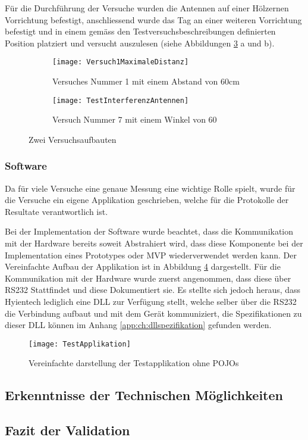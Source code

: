 Für die Durchführung der Versuche wurden die Antennen auf einer Hölzernen Vorrichtung befestigt, anschliessend wurde das Tag an einer weiteren Vorrichtung befestigt und in einem gemäss den Testversuchsbeschreibungen definierten Position platziert und versucht auszulesen (siehe Abbildungen \ref{fig:versuchsaufbauten} a und b).
\begin{figure}[h!]
	\begin{subfigure}{.5\linewidth}
		\texttt{[image: Versuch1MaximaleDistanz]}
		\caption{Versuches Nummer 1 mit einem Abstand von 60cm}
		\label{fig:versuchaufbaunmr1}
	\end{subfigure}\hfill%
	\begin{subfigure}{.35\linewidth}
		\centering
		\texttt{[image: TestInterferenzAntennen]}
		\caption{Versuch Nummer 7 mit einem Winkel von 60\SIUnitSymbolDegree}
		\label{fig:versuchaufbaunmr7}
	\end{subfigure}
	\caption{Zwei Versuchsaufbauten}
	\label{fig:versuchsaufbauten}
\end{figure}


\subsubsection{Software}
Da für viele Versuche eine genaue Messung eine wichtige Rolle spielt, wurde für die Versuche ein eigene Applikation geschrieben, welche für die Protokolle der Resultate verantwortlich ist.

Bei der Implementation der Software wurde beachtet, dass die Kommunikation mit der Hardware bereits soweit Abstrahiert wird, dass diese Komponente bei der Implementation eines Prototypes oder MVP wiederverwendet werden kann.
Der Vereinfachte Aufbau der Applikation ist in Abbildung \ref{fig:test_applikation_aufbau} dargestellt. Für die Kommunikation mit der Hardware wurde zuerst angenommen, dass diese über RS232 Stattfindet und diese Dokumentiert sie. Es stellte sich jedoch heraus, dass Hyientech lediglich eine DLL zur Verfügung stellt, welche selber über die RS232 die Verbindung aufbaut und mit dem Gerät kommuniziert, die Spezifikationen zu dieser DLL können im Anhang \ref{app:ch:dllspezifikation} gefunden werden.
\begin{figure}[h!]
	\centering
	\texttt{[image: TestApplikation]}
	\caption{Vereinfachte darstellung der Testapplikation ohne POJOs}
	\label{fig:test_applikation_aufbau}
\end{figure}
 
\subsection{Erkenntnisse der Technischen Möglichkeiten}

\subsection{Fazit der Validation}